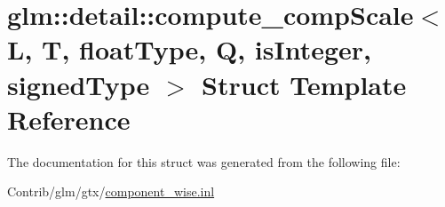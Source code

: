\hypertarget{structglm_1_1detail_1_1compute__comp_scale}{}\section{glm\+:\+:detail\+:\+:compute\+\_\+comp\+Scale$<$ L, T, float\+Type, Q, is\+Integer, signed\+Type $>$ Struct Template Reference}
\label{structglm_1_1detail_1_1compute__comp_scale}


The documentation for this struct was generated from the following file\+:\begin{DoxyCompactItemize}
\item 
Contrib/glm/gtx/\mbox{\hyperlink{component__wise_8inl}{component\+\_\+wise.\+inl}}\end{DoxyCompactItemize}
